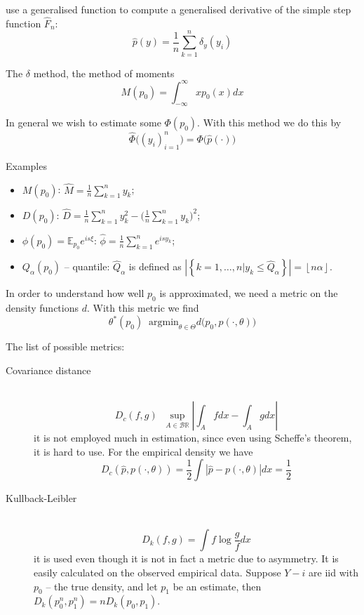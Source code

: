 \documentclass[a4paper]{article}
\newcommand{\obj}[1]{{\left\{ #1 \right \}}}
\newcommand{\induc}[1]{{\left . #1 \right \vert}}
\newcommand{\abs}[1]{{\left | #1 \right |}}
\newcommand{\floor}[1]{{\left\lfloor #1 \right\rfloor}}
\newcommand{\Real}{\mathbb{R}}
\newcommand{\borel}{\mathcal{B}}
\newcommand{\ex}{\mathbb{E}}
\newcommand{\defn}{\mathop{\overset{\Delta}{=}}\nolimits}
\begin{document}
use a generalised function to compute a generalised derivative of the simple step function $\hat{F}_n$:
\[ \hat{p}(y) = \frac{1}{n} \sum_{k=1}^n \delta_y(y_i) \]


The $\delta$ method, the method of moments
\[M(p_0) = \int_{-\infty}^\infty x p_0(x) dx\]

In general we wish to estimate some $\Phi(p_0)$. With this method we do this by
\[\hat{\Phi}\big((y_i)_{i=1}^n\big) = \Phi\big(\hat{p}(\cdot)\big)\]

Examples
\begin{itemize}
	\item $M(p_0)$: $\hat{M} = \frac{1}{n}\sum_{k=1}^n y_k$;
	\item $D(p_0)$: $\hat{D} = \frac{1}{n}\sum_{k=1}^n y_k^2 - \big(\frac{1}{n}\sum_{k=1}^n y_k\big)^2$;
	\item $\phi(p_0) = \ex_{p_0} e^{is\xi}$: $\hat{\phi} = \frac{1}{n}\sum_{k=1}^n e^{isy_k}$;
	\item $Q_\alpha(p_0)$ -- quantile: $\hat{Q}_\alpha$ is defined as $\abs{\obj{\induc{k=1,\ldots,n} y_k \leq \hat{Q}_\alpha}} = \floor{n\alpha}$.
\end{itemize}

In order to understand how well $p_0$ is approximated, we need a metric on the density functions $d$. With this metric we find
\[\theta^*(p_0) \defn \text{argmin}_{\theta \in\Theta} d\Big(p_0, p(\cdot,\theta)\Big) \]

The list of possible metrics: \begin{description}
	\item[Covariance distance]\hfill \\
	\[D_c(f,g)\defn \sup_{A\in \borel{\Real}} \abs{\int_A f dx - \int_A g dx}\]
	it is not employed much in estimation, since even using Scheffe's theorem, it is hard to use.
	For the empirical density we have
	\[D_c(\hat{p}, p(\cdot,\theta)) = \frac{1}{2} \int \abs{\hat{p} - p(\cdot,\theta)}dx = \frac{1}{2}\]
	\item[Kullback-Leibler]\hfill \\
	\[D_k(f,g) = \int f \log \frac{g}{f} dx\]
	it is used even though it is not in fact a metric due to asymmetry.
	It is easily calculated on the observed empirical data.
	Suppose $Y-i$ are iid with $p_0$ -- the true density, and let $p_1$ be an estimate, then $D_k(p_0^n, p_1^n) = nD_k(p_0,p_1)$.
\end{description}
\end{document}
